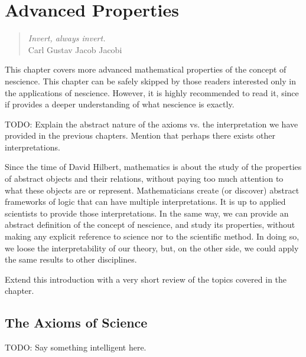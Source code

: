 %
%


\chapter{Advanced Properties}
\label{chap:Properties-Nescience}

\begin{quote}
\begin{flushright}
\emph{Invert, always invert.}\\
Carl Gustav Jacob Jacobi\\
\end{flushright}
\end{quote}
\bigskip

This chapter covers more advanced mathematical properties of the concept of nescience. This chapter can be safely skipped by those readers interested only in the applications of nescience. However, it is highly recommended to read it, since if provides a deeper understanding of what nescience is exactly.

{\color{red} TODO: Explain the abstract nature of the axioms vs. the interpretation we have provided in the previous chapters. Mention that perhaps there exists other interpretations.}

Since the time of David Hilbert, mathematics is about the study of the properties of abstract objects and their relations, without paying too much attention to what these objects are or represent. Mathematicians create (or discover) abstract frameworks of logic that can have multiple interpretations. It is up to applied scientists to provide those interpretations. In the same way, we can provide an abstract definition of the concept of nescience, and study its properties, without making any explicit reference to science nor to the scientific method. In doing so, we loose the interpretability of our theory, but, on the other side, we could apply the same results to other disciplines.

{\color{red} Extend this introduction with a very short review of the topics covered in the chapter.}

%
%

\section{The Axioms of Science}

{\color{red} TODO: Say something intelligent here.}

